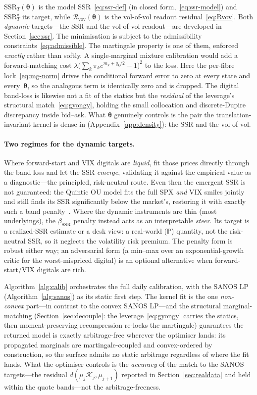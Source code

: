 \documentclass[11pt]{article}
\newcommand{\cK}{\mathcal{K}}
\newcommand{\cR}{\mathcal{R}}
\newcommand{\SSR}{\mathrm{SSR}}
\newcommand{\bth}{{\boldsymbol{\theta}}}
\begin{document}
$\SSR_T(\bth)$ is the model SSR~\eqref{eq:ssr-def} (in closed form,~\eqref{eq:ssr-model}) and
$\SSR^\star_T$ its target, while $\cR_{\mathrm{vov}}(\bth)$ is the vol-of-vol readout
residual~\eqref{eq:Rvov}. Both \emph{dynamic} targets---the SSR and the vol-of-vol readout---are
developed in Section~\ref{sec:ssr}. The minimisation is subject to the admissibility
constraints~\eqref{eq:admissible}. The martingale property is
one of them, enforced \emph{exactly} rather than softly. A single-marginal mixture
calibration would add a forward-matching cost
$\lambda\big(\sum_k\pi_k e^{m_k+q_k/2}-1\big)^2$ to the loss. Here the per-fibre
lock~\eqref{eq:mg-norm} drives the conditional forward error to zero at every state and
every~$\bth$, so the analogous term is identically zero and is dropped. The digital band-loss is likewise
not a fit of the statics but the \emph{residual} of the leverage's structural
match~\eqref{eq:gyongy}, holding the small collocation and discrete-Dupire discrepancy inside bid--ask.
What $\bth$ genuinely controls is the pair the translation-invariant kernel is dense in
(Appendix~\ref{app:density}): the SSR and the vol-of-vol.

\paragraph{Two regimes for the dynamic targets.}
Where forward-start and VIX digitals are
\emph{liquid}, fit those prices directly through the band-loss and let the SSR
\emph{emerge}, validating it against the empirical value as a diagnostic---the principled,
risk-neutral route. Even then the emergent SSR is not guaranteed: the Quintic OU model fits the
full SPX \emph{and} VIX smiles jointly and still finds its SSR significantly below the market's,
restoring it with exactly such a band penalty~\cite{abijaber2025}. Where the dynamic instruments
are thin (most underlyings), the $\beta_{\SSR}$ penalty instead acts as an interpretable
\emph{steer}. Its target is a realized-SSR estimate or a desk view: a real-world
($\mathbb P$) quantity, not the risk-neutral SSR, so it neglects the volatility risk premium. The penalty form is robust either way; an adversarial form (a min--max over an
exponential-growth critic for the worst-mispriced digital) is an optional alternative when
forward-start/VIX digitals are rich.

Algorithm~\ref{alg:calib} orchestrates the full daily calibration, with the SANOS LP
(Algorithm~\ref{alg:sanos}) as its static first step. The kernel fit is the one
\emph{non-convex} part---in contrast to the convex SANOS LP---and the structural
marginal-matching (Section~\ref{sec:decouple}: the leverage~\eqref{eq:gyongy} carries the
statics, then moment-preserving recompression re-locks the martingale) guarantees the
returned model is exactly arbitrage-free wherever the optimiser lands: its propagated marginals are
martingale-coupled and convex-ordered by construction, so the surface admits no static arbitrage regardless
of where the fit lands. What the optimiser controls is the \emph{accuracy} of the match to the SANOS
targets---the residual $d(\mu_j\cK_j,\mu_{j+1})$ reported in Section~\ref{sec:realdata} and held within the
quote bands---not the arbitrage-freeness.
\end{document}
